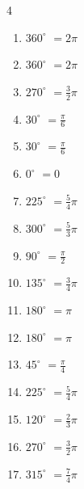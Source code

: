 \begin{multicols}{4}
\begin{enumerate}
  \item $\displaystyle 360^{\circ}$
        $\displaystyle =2\pi$

  \item $\displaystyle 360^{\circ}$
        $\displaystyle =2\pi$

  \item $\displaystyle 270^{\circ}$
        $\displaystyle =\frac{3}{2}\pi$

  \item $\displaystyle 30^{\circ}$
        $\displaystyle =\frac{\pi}{6}$

  \item $\displaystyle 30^{\circ}$
        $\displaystyle =\frac{\pi}{6}$

  \item $\displaystyle 0^{\circ}$
        $\displaystyle =0$

  \item $\displaystyle 225^{\circ}$
        $\displaystyle =\frac{5}{4}\pi$

  \item $\displaystyle 300^{\circ}$
        $\displaystyle =\frac{5}{3}\pi$

  \item $\displaystyle 90^{\circ}$
        $\displaystyle =\frac{\pi}{2}$

  \item $\displaystyle 135^{\circ}$
        $\displaystyle =\frac{3}{4}\pi$

  \item $\displaystyle 180^{\circ}$
        $\displaystyle =\pi$

  \item $\displaystyle 180^{\circ}$
        $\displaystyle =\pi$

  \item $\displaystyle 45^{\circ}$
        $\displaystyle =\frac{\pi}{4}$

  \item $\displaystyle 225^{\circ}$
        $\displaystyle =\frac{5}{4}\pi$

  \item $\displaystyle 120^{\circ}$
        $\displaystyle =\frac{2}{3}\pi$

  \item $\displaystyle 270^{\circ}$
        $\displaystyle =\frac{3}{2}\pi$

  \item $\displaystyle 315^{\circ}$
        $\displaystyle =\frac{7}{4}\pi$


\end{enumerate}
\end{multicols}
